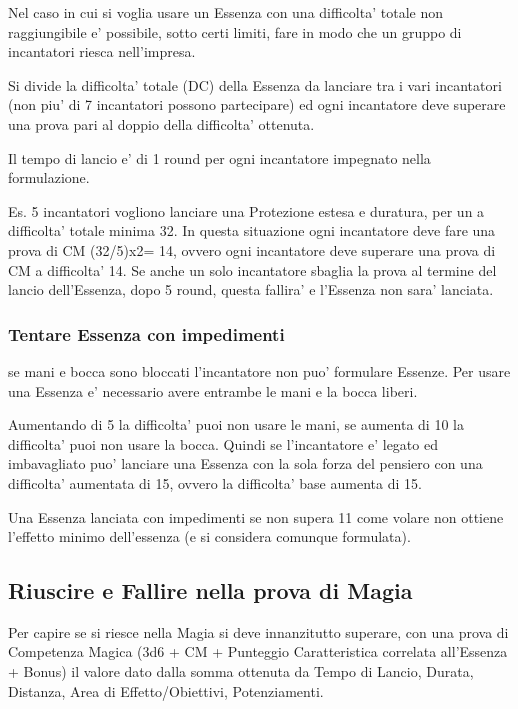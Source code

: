 \documentclass[a4paper,11pt,twoside,openany]{book}
\begin{document}
	Nel caso in cui si voglia usare un Essenza con una difficolta' totale non raggiungibile e' possibile, sotto certi limiti, fare in modo che un gruppo di incantatori riesca nell'impresa.
	
	Si divide la difficolta' totale (DC) della Essenza da lanciare tra i vari incantatori (non piu' di 7 incantatori possono partecipare) ed ogni incantatore deve superare una prova pari al doppio della difficolta' ottenuta.
	
	Il tempo di lancio e' di 1 round per ogni incantatore impegnato nella formulazione.
	
	Es. 5 incantatori vogliono lanciare una Protezione estesa e duratura, per un a difficolta' totale minima 32. In questa situazione ogni incantatore deve fare una prova di CM (32/5)x2= 14, ovvero ogni incantatore deve superare una prova di CM a difficolta' 14. Se anche un solo incantatore sbaglia la prova al termine del lancio dell'Essenza, dopo 5 round, questa fallira' e l'Essenza non sara' lanciata.
	
	\subsubsection{Tentare Essenza con impedimenti}
	
	se mani e bocca sono bloccati l'incantatore non puo' formulare Essenze. Per usare una Essenza e' necessario avere entrambe le mani e la bocca liberi.
	
	Aumentando di 5 la difficolta' puoi non usare le mani, se aumenta di 10 la difficolta' puoi non usare la bocca. Quindi se l'incantatore e' legato ed imbavagliato puo' lanciare una Essenza con la sola forza del pensiero con una difficolta' aumentata di 15, ovvero la difficolta' base aumenta di 15.
	
	Una Essenza lanciata con impedimenti se non supera 11 come volare non ottiene l'effetto minimo dell'essenza (e si considera comunque formulata).
	
	\subsection{Riuscire e Fallire nella prova di Magia}
	
	\label{riuscire-e-fallire-nella-prova-di-magia}
	
	Per capire se si riesce nella Magia si deve innanzitutto superare, con una prova di Competenza Magica (3d6 + CM + Punteggio Caratteristica correlata all'Essenza + Bonus) il valore dato dalla somma ottenuta da Tempo di Lancio, Durata, Distanza, Area di Effetto/Obiettivi, Potenziamenti.
	
\end{document}
